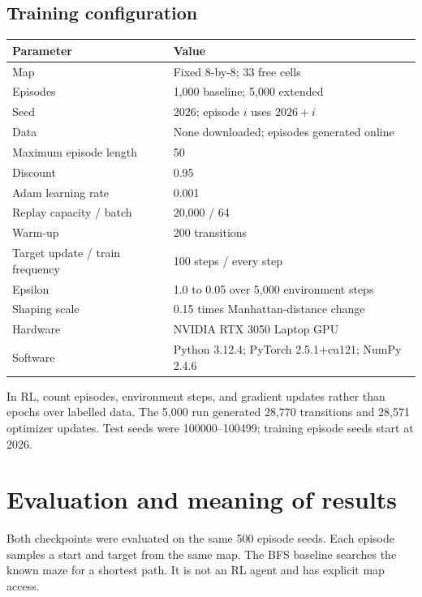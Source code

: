 \documentclass[11pt,a4paper]{article}
\begin{document}
\subsection{Training configuration}
\begin{center}
\small
\begin{tabular}{ll}
\toprule
Parameter & Value\\
\midrule
Map & Fixed 8-by-8; 33 free cells\\
Episodes & 1,000 baseline; 5,000 extended\\
Seed & 2026; episode $i$ uses $2026+i$\\
Data & None downloaded; episodes generated online\\
Maximum episode length & 50\\
Discount & 0.95\\
Adam learning rate & 0.001\\
Replay capacity / batch & 20,000 / 64\\
Warm-up & 200 transitions\\
Target update / train frequency & 100 steps / every step\\
Epsilon & 1.0 to 0.05 over 5,000 environment steps\\
Shaping scale & 0.15 times Manhattan-distance change\\
Hardware & NVIDIA RTX 3050 Laptop GPU\\
Software & Python 3.12.4; PyTorch 2.5.1+cu121; NumPy 2.4.6\\
\bottomrule
\end{tabular}
\end{center}
In RL, count episodes, environment steps, and gradient updates rather than epochs over labelled data. The 5,000 run generated 28,770 transitions and 28,571 optimizer updates. Test seeds were 100000--100499; training episode seeds start at 2026.

\section{Evaluation and meaning of results}
Both checkpoints were evaluated on the same 500 episode seeds. Each episode samples a start and target from the same map. The BFS baseline searches the known maze for a shortest path. It is not an RL agent and has explicit map access.
\end{document}
